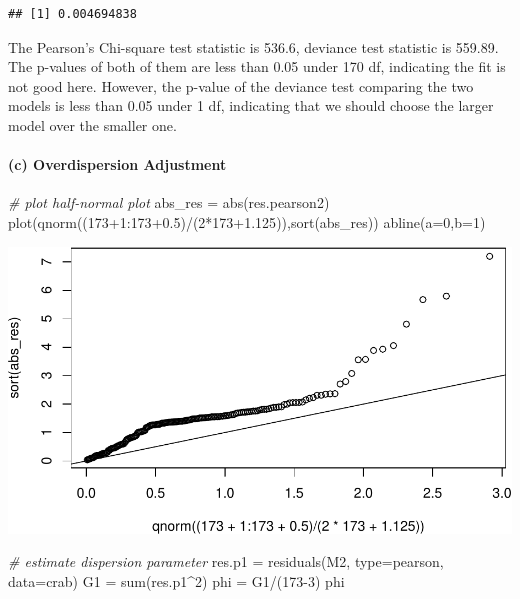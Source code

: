 \documentclass[
]{article}
\newenvironment{Shaded}{\begin{snugshade}}{\end{snugshade}}
\newcommand{\AttributeTok}[1]{\textcolor[rgb]{0.77,0.63,0.00}{#1}}
\newcommand{\CommentTok}[1]{\textcolor[rgb]{0.56,0.35,0.01}{\textit{#1}}}
\newcommand{\DecValTok}[1]{\textcolor[rgb]{0.00,0.00,0.81}{#1}}
\newcommand{\FloatTok}[1]{\textcolor[rgb]{0.00,0.00,0.81}{#1}}
\newcommand{\FunctionTok}[1]{\textcolor[rgb]{0.00,0.00,0.00}{#1}}
\newcommand{\NormalTok}[1]{#1}
\newcommand{\OtherTok}[1]{\textcolor[rgb]{0.56,0.35,0.01}{#1}}
\newcommand{\SpecialCharTok}[1]{\textcolor[rgb]{0.00,0.00,0.00}{#1}}
\newcommand{\StringTok}[1]{\textcolor[rgb]{0.31,0.60,0.02}{#1}}
\begin{document}
\begin{verbatim}
## [1] 0.004694838
\end{verbatim}

The Pearson's Chi-square test statistic is 536.6, deviance test
statistic is 559.89. The p-values of both of them are less than 0.05
under 170 df, indicating the fit is not good here. However, the p-value
of the deviance test comparing the two models is less than 0.05 under 1
df, indicating that we should choose the larger model over the smaller
one.

\hypertarget{c-overdispersion-adjustment}{%
\paragraph{(c) Overdispersion
Adjustment}\label{c-overdispersion-adjustment}}

\begin{Shaded}
\begin{Highlighting}[]
\CommentTok{\# plot half{-}normal plot}
\NormalTok{abs\_res }\OtherTok{=} \FunctionTok{abs}\NormalTok{(res.pearson2)}
\FunctionTok{plot}\NormalTok{(}\FunctionTok{qnorm}\NormalTok{((}\DecValTok{173}\SpecialCharTok{+}\DecValTok{1}\SpecialCharTok{:}\DecValTok{173}\FloatTok{+0.5}\NormalTok{)}\SpecialCharTok{/}\NormalTok{(}\DecValTok{2}\SpecialCharTok{*}\DecValTok{173}\FloatTok{+1.125}\NormalTok{)),}\FunctionTok{sort}\NormalTok{(abs\_res))}
\FunctionTok{abline}\NormalTok{(}\AttributeTok{a=}\DecValTok{0}\NormalTok{,}\AttributeTok{b=}\DecValTok{1}\NormalTok{)}
\end{Highlighting}
\end{Shaded}

\includegraphics{HW5_files/figure-latex/unnamed-chunk-4-1.pdf}

\begin{Shaded}
\begin{Highlighting}[]
\CommentTok{\# estimate dispersion parameter}
\NormalTok{res.p1 }\OtherTok{=} \FunctionTok{residuals}\NormalTok{(M2, }\AttributeTok{type=}\StringTok{\textquotesingle{}pearson\textquotesingle{}}\NormalTok{, }\AttributeTok{data=}\NormalTok{crab)}
\NormalTok{G1 }\OtherTok{=} \FunctionTok{sum}\NormalTok{(res.p1}\SpecialCharTok{\^{}}\DecValTok{2}\NormalTok{)}
\NormalTok{phi }\OtherTok{=}\NormalTok{ G1}\SpecialCharTok{/}\NormalTok{(}\DecValTok{173{-}3}\NormalTok{)}
\NormalTok{phi}
\end{Highlighting}
\end{Shaded}
\end{document}
